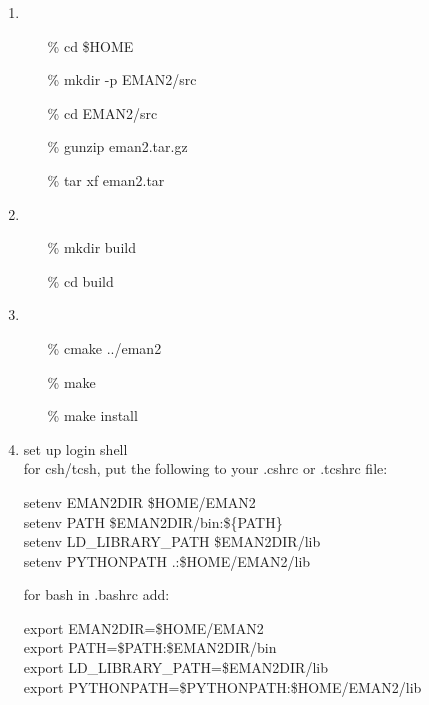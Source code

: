 \begin{enumerate}
    \item
      \begin{itemize}
          \item[\%] cd \$HOME
          \item[\%] mkdir -p EMAN2/src
          \item[\%] cd EMAN2/src
          \item[\%] gunzip eman2.tar.gz
          \item[\%] tar xf eman2.tar \\
      \end{itemize}
      \normalcolor
    \item
      \begin{itemize}
	  \item[\%]mkdir build
	  \item[\%]cd build \\
       \end{itemize}
      \normalcolor

     \item       
       \begin{itemize}
	 \item[\%]cmake ../eman2
         \item[\%]make
         \item[\%]make install \\
       \end{itemize}
       \normalcolor

     \item
          set up login shell\\
          for csh/tcsh, put the following to your .cshrc or .tcshrc file:
	  
          setenv EMAN2DIR \$HOME/EMAN2\\
          setenv PATH \$EMAN2DIR/bin:\$\{PATH\}\\
          setenv LD\_LIBRARY\_PATH  \$EMAN2DIR/lib\\
          setenv PYTHONPATH .:\$HOME/EMAN2/lib\\
	  \normalcolor

	  for bash in .bashrc add:
	
          export EMAN2DIR=\$HOME/EMAN2\\
          export PATH=\$PATH:\$EMAN2DIR/bin\\
          export LD\_LIBRARY\_PATH=\$EMAN2DIR/lib\\
          export PYTHONPATH=\$PYTHONPATH:\$HOME/EMAN2/lib
	  \normalcolor
\end{enumerate}


